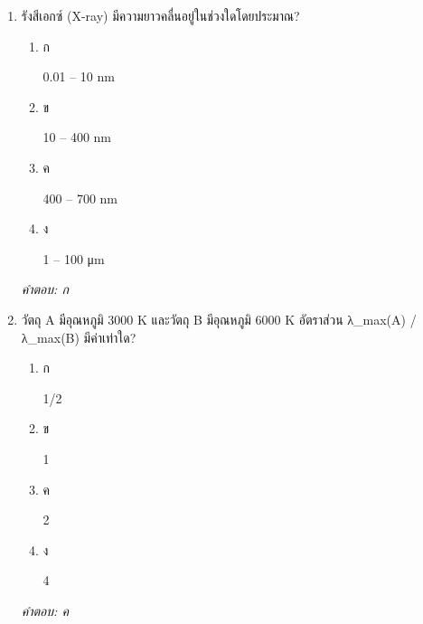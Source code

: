 \documentclass[12pt]{article}
\begin{document}
\begin{enumerate}[label=\arabic*., itemsep=0.5\baselineskip, topsep=0.5\baselineskip, leftmargin=*]
\item รังสีเอกซ์ (X-ray) มีความยาวคลื่นอยู่ในช่วงใดโดยประมาณ?
\begin{enumerate}[label=\alph*)., itemsep=0.3\baselineskip, topsep=0.3\baselineskip]
\item ก\ 
\begin{minipage}[t]{0.9\linewidth}
\raggedright 0.01 – 10 nm
\end{minipage}
\item ข\ 
\begin{minipage}[t]{0.9\linewidth}
\raggedright 10 – 400 nm
\end{minipage}
\item ค\ 
\begin{minipage}[t]{0.9\linewidth}
\raggedright 400 – 700 nm
\end{minipage}
\item ง\ 
\begin{minipage}[t]{0.9\linewidth}
\raggedright 1 – 100 μm
\end{minipage}
\end{enumerate}
\vspace{-0.3\baselineskip}
\begin{small}
\textit{คำตอบ: ก}
\end{small}

\item วัตถุ A มีอุณหภูมิ 3000 K และวัตถุ B มีอุณหภูมิ 6000 K อัตราส่วน λ\_max(A) / λ\_max(B) มีค่าเท่าใด?
\begin{enumerate}[label=\alph*)., itemsep=0.3\baselineskip, topsep=0.3\baselineskip]
\item ก\ 
\begin{minipage}[t]{0.9\linewidth}
\raggedright 1/2
\end{minipage}
\item ข\ 
\begin{minipage}[t]{0.9\linewidth}
\raggedright 1
\end{minipage}
\item ค\ 
\begin{minipage}[t]{0.9\linewidth}
\raggedright 2
\end{minipage}
\item ง\ 
\begin{minipage}[t]{0.9\linewidth}
\raggedright 4
\end{minipage}
\end{enumerate}
\vspace{-0.3\baselineskip}
\begin{small}
\textit{คำตอบ: ค}
\end{small}


\end{enumerate}
\end{document}
